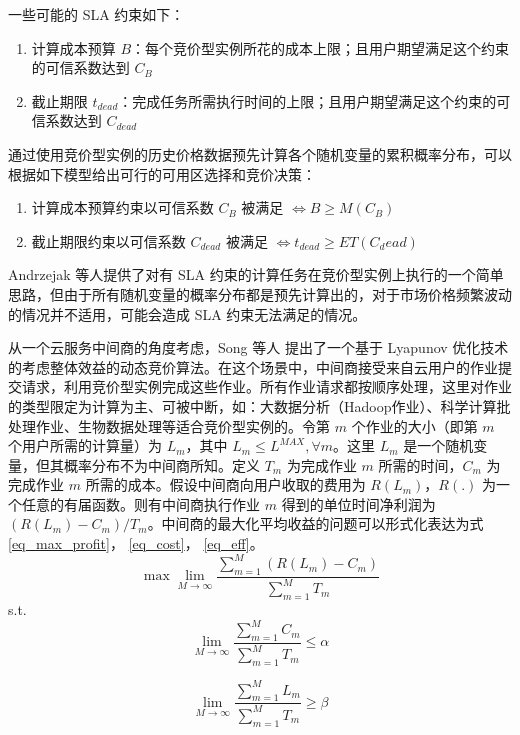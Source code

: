 一些可能的 SLA 约束如下：
\begin{enumerate}
\item 计算成本预算 $B$：每个竞价型实例所花的成本上限；且用户期望满足这个约束的可信系数达到 $C_B$
\item 截止期限 $t_{dead}$：完成任务所需执行时间的上限；且用户期望满足这个约束的可信系数达到 $C_{dead}$
\end{enumerate}

通过使用竞价型实例的历史价格数据预先计算各个随机变量的累积概率分布，可以根据如下模型给出可行的可用区选择和竞价决策：
\begin{enumerate}
\item 计算成本预算约束以可信系数 $C_B$ 被满足 $\iff B \geq M(C_B)$
\item 截止期限约束以可信系数 $C_{dead}$ 被满足 $\iff t_{dead} \geq ET(C_dead)$
\end{enumerate}

Andrzejak 等人提供了对有 SLA 约束的计算任务在竞价型实例上执行的一个简单思路，但由于所有随机变量的概率分布都是预先计算出的，对于市场价格频繁波动的情况并不适用，可能会造成 SLA 约束无法满足的情况。

从一个云服务中间商的角度考虑，Song 等人 \cite{song2012optimal} 提出了一个基于 Lyapunov 优化技术的考虑整体效益的动态竞价算法。在这个场景中，中间商接受来自云用户的作业提交请求，利用竞价型实例完成这些作业。所有作业请求都按顺序处理，这里对作业的类型限定为计算为主、可被中断，如：大数据分析（Hadoop作业）、科学计算批处理作业、生物数据处理等适合竞价型实例的。令第 $m$ 个作业的大小（即第 $m$ 个用户所需的计算量）为 $L_m$，其中 $L_m \leq L^{MAX}, \forall m$。这里 $L_m$ 是一个随机变量，但其概率分布不为中间商所知。定义 $T_m$ 为完成作业 $m$ 所需的时间，$C_m$ 为完成作业 $m$ 所需的成本。假设中间商向用户收取的费用为 $R(L_m)$，$R(.)$ 为一个任意的有届函数。则有中间商执行作业 $m$ 得到的单位时间净利润为 $(R(L_m) - C_m)/T_m$。中间商的最大化平均收益的问题可以形式化表达为式 \eqref{eq_max_profit}， \eqref{eq_cost}， \eqref{eq_eff}。
\begin{equation}\label{eq_max_profit} 
\max \lim_{M \rightarrow \infty}{\frac{\sum_{m=1}^M(R(L_m)-C_m)}{\sum_{m=1}^MT_m}}  
\end{equation}
s.t.
\begin{equation}\label{eq_cost} 
\lim_{M \rightarrow \infty}{\frac{\sum_{m=1}^MC_m}{\sum_{m=1}^MT_m}} \leq \alpha 
\end{equation}

\begin{equation}\label{eq_eff}
\lim_{M \rightarrow \infty}{\frac{\sum_{m=1}^ML_m}{\sum_{m=1}^MT_m}} \geq \beta 
\end{equation}

